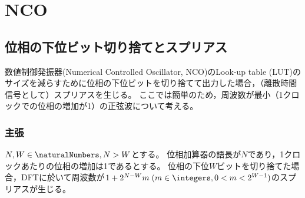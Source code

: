 \chapter{NCO}
    \section{位相の下位ビット切り捨てとスプリアス}
        数値制御発振器(Numerical Controlled Oscillator, NCO)のLook-up table (LUT)のサイズを減らすために位相の下位ビットを切り捨てて出力した場合，（離散時間信号として）スプリアスを生じる。
        ここでは簡単のため，周波数が最小（1クロックでの位相の増加が1）の正弦波について考える。
        \subsection{主張}
            \begin{shadebox}
                $N,W\in\naturalNumbers,N>W$とする。
                位相加算器の語長が$N$であり，1クロックあたりの位相の増加は1であるとする。
                位相の下位$W$ビットを切り捨てた場合，DFTに於いて周波数が$1 + 2^{N-W}m\;(m\in\integers,0<m<2^{W-1})$のスプリアスが生じる。
            \end{shadebox}
